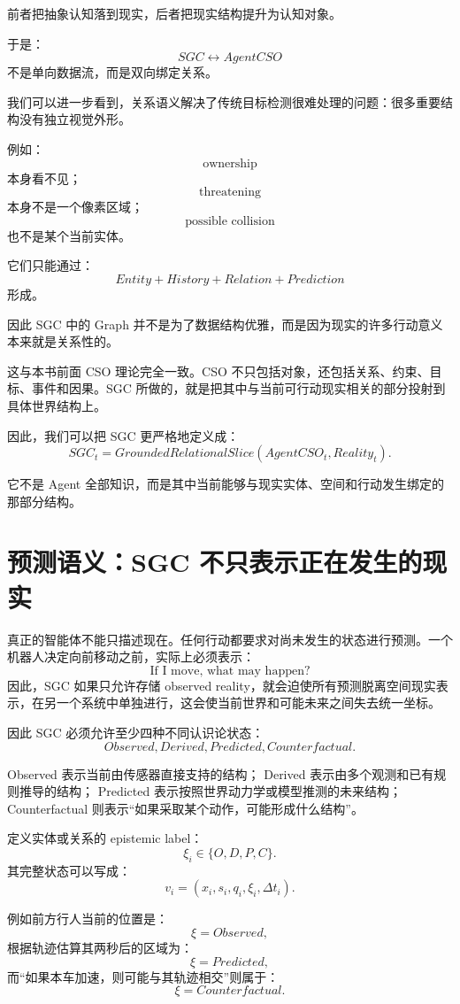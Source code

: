 前者把抽象认知落到现实，后者把现实结构提升为认知对象。

于是：
\[
SGC
\leftrightarrow
AgentCSO
\]
不是单向数据流，而是双向绑定关系。

我们可以进一步看到，关系语义解决了传统目标检测很难处理的问题：很多重要结构没有独立视觉外形。

例如：
\[
\text{ownership}
\]
本身看不见；
\[
\text{threatening}
\]
本身不是一个像素区域；
\[
\text{possible collision}
\]
也不是某个当前实体。

它们只能通过：
\[
Entity + History + Relation + Prediction
\]
形成。

因此 SGC 中的 Graph 并不是为了数据结构优雅，而是因为现实的许多行动意义本来就是关系性的。

这与本书前面 CSO 理论完全一致。CSO 不只包括对象，还包括关系、约束、目标、事件和因果。SGC 所做的，就是把其中与当前可行动现实相关的部分投射到具体世界结构上。

因此，我们可以把 SGC 更严格地定义成：
\[
\boxed{
SGC_t
=
GroundedRelationalSlice
(
AgentCSO_t,
Reality_t
).
}
\]

它不是 Agent 全部知识，而是其中当前能够与现实实体、空间和行动发生绑定的那部分结构。

\section{预测语义：SGC 不只表示正在发生的现实}

真正的智能体不能只描述现在。任何行动都要求对尚未发生的状态进行预测。一个机器人决定向前移动之前，实际上必须表示：
\[
\text{If I move, what may happen?}
\]
因此，SGC 如果只允许存储 observed reality，就会迫使所有预测脱离空间现实表示，在另一个系统中单独进行，这会使当前世界和可能未来之间失去统一坐标。

因此 SGC 必须允许至少四种不同认识论状态：
\[
\boxed{
Observed,
Derived,
Predicted,
Counterfactual.
}
\]

Observed 表示当前由传感器直接支持的结构；
Derived 表示由多个观测和已有规则推导的结构；
Predicted 表示按照世界动力学或模型推测的未来结构；
Counterfactual 则表示“如果采取某个动作，可能形成什么结构”。

定义实体或关系的 epistemic label：
\[
\xi_i
\in
\{
O,D,P,C
\}.
\]
其完整状态可以写成：
\[
v_i
=
(x_i,s_i,q_i,\xi_i,\Delta t_i).
\]

例如前方行人当前的位置是：
\[
\xi=Observed,
\]
根据轨迹估算其两秒后的区域为：
\[
\xi=Predicted,
\]
而“如果本车加速，则可能与其轨迹相交”则属于：
\[
\xi=Counterfactual.
\]

